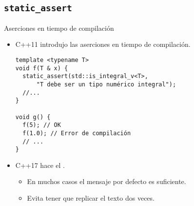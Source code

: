 \subsection{\bf{\texttt{static\_assert}}}

\begin{frame}[t,fragile]{Aserciones en tiempo de compilación}
\begin{itemize}
  \item C++11 introdujo las aserciones en tiempo de compilación.
\begin{lstlisting}
template <typename T>
void f(T & x) {
  static_assert(std::is_integral_v<T>, 
      "T debe ser un tipo numérico integral");
  //...
}

void g() {
  f(5); // OK
  f(1.0); // Error de compilación
  // ...
}
\end{lstlisting}

  \vfill\pause
  \item C++17 hace el .
    \begin{itemize}
      \item En muchos casos el mensaje por defecto es suficiente.
      \item Evita tener que replicar el texto dos veces.
    \end{itemize}
\end{itemize}
\end{frame}
